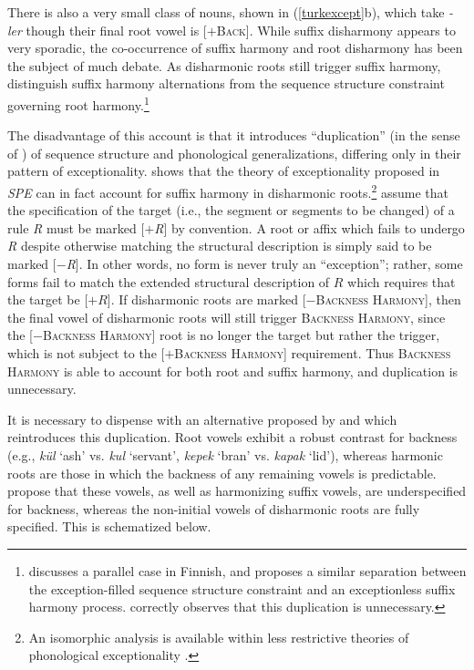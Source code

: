 \noindent
There is also a very small class of nouns, shown in (\ref{turkexcept}b), which take \emph{-ler} though their final root vowel is [$+$\textsc{Back}]. While suffix disharmony appears to very sporadic, the co-occurrence of suffix harmony and root disharmony has been the subject of much debate. As disharmonic roots still trigger suffix harmony, 
\citet{Iverson1978} distinguish suffix harmony alternations from the sequence structure constraint governing root harmony.\footnote{\citet[29f.]{Kiparsky1968} discusses a parallel case in Finnish, and proposes a similar separation between the exception-filled sequence structure constraint and an exceptionless suffix harmony process. \citet[171f.]{Howard1972} correctly observes that this duplication is unnecessary.}

The disadvantage of this account is that it introduces ``duplication'' (in the sense of \citealt{Kisseberth1970b}) of sequence structure and phonological generalizations, differing only in their pattern of exceptionality. \citet[][197f.]{Zonneveld1978} shows that the theory of exceptionality proposed in \emph{SPE} can in fact account for suffix harmony in disharmonic roots.\footnote{An isomorphic analysis is available within less restrictive theories of phonological exceptionality \citep[e.g.,][]{Kisseberth1970,Pater2009}.} \citeauthor{SPE} assume that the specification of the target (i.e., the segment or segments to be changed) of a rule \emph{R} must be marked [$+$\emph{R}] by convention. A root or affix which fails to undergo \emph{R} despite otherwise matching the structural description is simply said to be marked [$-$\emph{R}]. In other words, no form is never truly an ``exception''; rather, some forms fail to match the extended structural description of $R$ which requires that the target be [$+R$]. If disharmonic roots are marked [$-$\textsc{Backness Harmony}], then the final vowel of disharmonic roots will still trigger \textsc{Backness Harmony}, since the [$-$\textsc{Backness Harmony}] root is no longer the target but rather the trigger, which is not subject to the [$+$\textsc{Backness Harmony}] requirement. Thus \textsc{Backness Harmony} is able to account for both root and suffix harmony, and duplication is unnecessary.

It is necessary to dispense with an alternative proposed by \citet{Clements1982} and \citet{Inkelas1997} which reintroduces this duplication. Root vowels exhibit a robust contrast for backness (e.g., \emph{kül} `ash' vs.  \emph{kul} `servant', \emph{kepek} `bran' vs. \emph{kapak} `lid'), whereas harmonic roots are those in which the backness of any remaining vowels is predictable. \citeauthor{Clements1982} propose that these vowels, as well as harmonizing suffix vowels, are underspecified for backness, whereas the non-initial vowels of disharmonic roots are fully specified. This is schematized below.


